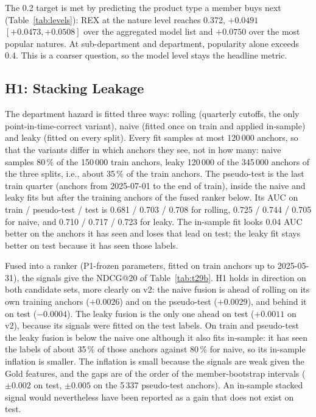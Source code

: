 \documentclass{ieeeaccess}
\begin{document}
The 0.2 target is met by predicting the product type a member buys next (Table~\ref{tab:levels}): REX at the nature level reaches
0.372, $+0.0491$ $[+0.0473, +0.0508]$ over the aggregated model list and $+0.0750$ over the most popular natures. At sub-department
and department, popularity alone exceeds 0.4. This is a coarser question, so the model level stays the headline metric.

\subsection{H1: Stacking Leakage}
\label{sec:h1}
The department hazard is fitted three ways: rolling (quarterly cutoffs, the only point-in-time-correct variant), naive (fitted once on
train and applied in-sample) and leaky (fitted on every split). Every fit samples at most 120\,000 anchors, so that the variants
differ in which anchors they see, not in how many: naive samples 80\,\% of the 150\,000 train anchors, leaky 120\,000 of the 345\,000
anchors of the three splits, i.e., about 35\,\% of the train anchors. The pseudo-test is the last train quarter (anchors from
2025-07-01 to the end of train), inside the naive and leaky fits but after the training anchors of the fused ranker below. Its AUC on train / pseudo-test / test is 0.681 /
0.703 / 0.708 for rolling, 0.725 / 0.744 / 0.705 for naive, and 0.710 / 0.717 / 0.723 for leaky. The in-sample fit looks 0.04 AUC
better on the anchors it has seen and loses that lead on test; the leaky fit stays better on test because it has seen those labels.

Fused into a ranker (P1-frozen parameters, fitted on train anchors up to 2025-05-31), the signals give the NDCG@20 of
Table~\ref{tab:t29b}. H1 holds in direction on both candidate sets, more clearly on v2: the naive fusion is ahead of rolling on its own
training anchors ($+0.0026$) and on the pseudo-test ($+0.0029$), and behind it on test ($-0.0004$). The leaky fusion is the only one
ahead on test ($+0.0011$ on v2), because its signals were fitted on the test labels. On train and pseudo-test the leaky fusion is
below the naive one although it also fits in-sample: it has seen the labels of about 35\,\% of those anchors against 80\,\% for naive,
so its in-sample inflation is smaller. The inflation is small because the signals are
weak given the Gold features, and the gaps are of the order of the member-bootstrap intervals ($\pm 0.002$ on test, $\pm 0.005$ on the
5\,337 pseudo-test anchors). An in-sample stacked signal would nevertheless have been reported as a gain that does not exist on test.
\end{document}
